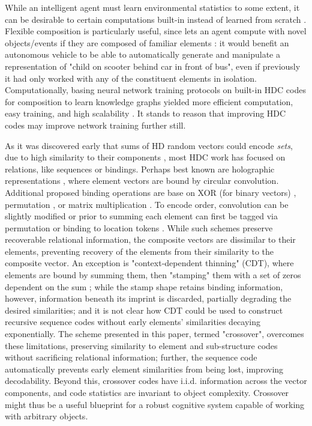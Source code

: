 \documentclass{article}
\begin{document}
While an intelligent agent must learn environmental statistics to some extent, it can be desirable to certain computations built-in instead of learned from scratch \cite{Zador:2019}. Flexible composition is particularly useful, since lets an agent compute with novel objects/events if they are composed of familiar elements \cite{Jackendoff, Gayler}: it would benefit an autonomous vehicle to be able to automatically generate and manipulate a representation of "child on scooter behind car in front of bus", even if previously it had only worked with any of the constituent elements in isolation. Computationally, basing neural network training protocols on built-in HDC codes for composition \cite{Plate} to learn knowledge graphs yielded more efficient computation, easy training, and high scalability \cite{Nickel:2015}. It stands to reason that improving HDC codes may improve network training further still.

As it was discovered early that sums of HD random vectors could encode \textit{sets}, due to high similarity to their components \cite{Bloom:1970, Anderson:1973, Plate:1994}, most HDC work has focused on relations, like sequences or bindings. Perhaps best known are holographic representations \cite{Plate:1995}, where element vectors are bound by circular convolution. Additional proposed binding operations are base on XOR (for binary vectors) \cite{Kanerva:1996}, permutation \cite{Gayler:1998}, or matrix multiplication \cite{Gosmann:2019}. To encode order, convolution can be slightly modified \cite{Murdock:1983, Plate:1995} or prior to summing each element can first be tagged via permutation \cite{Sahlgren:2008} or binding to location tokens \cite{Kanerva:1996}. While such schemes preserve recoverable relational information, the composite vectors are dissimilar to their elements, preventing recovery of the elements from their similarity to the composite vector. An exception is "context-dependent thinning" (CDT), where elements are bound by summing them, then "stamping" them with a set of zeros dependent on the sum \cite{Rachkovskij:2001}; while the stamp shape retains binding information, however, information beneath its imprint is discarded, partially degrading the desired similarities; and it is not clear how CDT could be used to construct recursive sequence codes without early elements' similarities decaying exponentially. The scheme presented in this paper, termed "crossover", overcomes these limitations, preserving similarity to element and sub-structure codes without sacrificing relational information; further, the sequence code automatically prevents early element similarities from being lost, improving decodability. Beyond this, crossover codes have i.i.d. information across the vector components, and code statistics are invariant to object complexity. Crossover might thus be a useful blueprint for a robust cognitive system capable of working with arbitrary objects.
\end{document}
